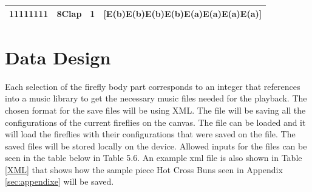 \begin{table}
\begin{tabular}{|l|l|l|l|}
\hline
11111111                                                                                               & 8Clap                                                                                                          & 1                                                                                                & {[}E(b)E(b)E(b)E(b)E(a)E(a)E(a)E(a)]                                                                                                             \\
\hline
\end{tabular}
\end{table}

\section{Data Design}
Each selection of the firefly body part corresponds to an integer that references into a music library to get the necessary music files needed for the playback. The chosen format for the save files will be using XML. The file will be saving all the configurations of the current fireflies on the canvas. The file can be loaded and it will load the fireflies with their configurations that were saved on the file. The saved files will be stored locally on the device. Allowed inputs for the files can be seen in the table below in Table 5.6. An example xml file is also shown in Table \ref{XML} that shows how the sample piece Hot Cross Buns seen in Appendix \ref{sec:appendixe} will be saved.


